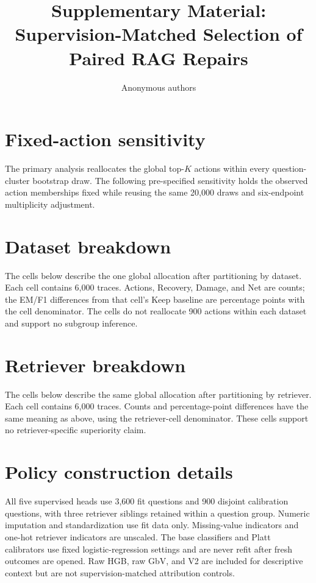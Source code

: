 \documentclass[10pt]{article}
\title{Supplementary Material: Supervision-Matched Selection of Paired RAG Repairs}
\author{Anonymous authors}
\date{}
\begin{document}
\maketitle

\section{Fixed-action sensitivity}
The primary analysis reallocates the global top-$K$ actions within every question-cluster bootstrap draw. The following pre-specified sensitivity holds the observed action memberships fixed while reusing the same 20,000 draws and six-endpoint multiplicity adjustment.

\begin{table}[h]
\centering
\caption{Fixed-action sensitivity. Values are percentage points.}
\resizebox{\textwidth}{!}{}
\end{table}

\section{Dataset breakdown}
The cells below describe the one global allocation after partitioning by dataset. Each cell contains 6,000 traces. Actions, Recovery, Damage, and Net are counts; the EM/F1 differences from that cell's Keep baseline are percentage points with the cell denominator. The cells do not reallocate 900 actions within each dataset and support no subgroup inference.


\section{Retriever breakdown}
The cells below describe the same global allocation after partitioning by retriever. Each cell contains 6,000 traces. Counts and percentage-point differences have the same meaning as above, using the retriever-cell denominator. These cells support no retriever-specific superiority claim.


\section{Policy construction details}
All five supervised heads use 3,600 fit questions and 900 disjoint calibration questions, with three retriever siblings retained within a question group. Numeric imputation and standardization use fit data only. Missing-value indicators and one-hot retriever indicators are unscaled. The base classifiers and Platt calibrators use fixed logistic-regression settings and are never refit after fresh outcomes are opened. Raw HGB, raw GbV, and V2 are included for descriptive context but are not supervision-matched attribution controls.
\end{document}
